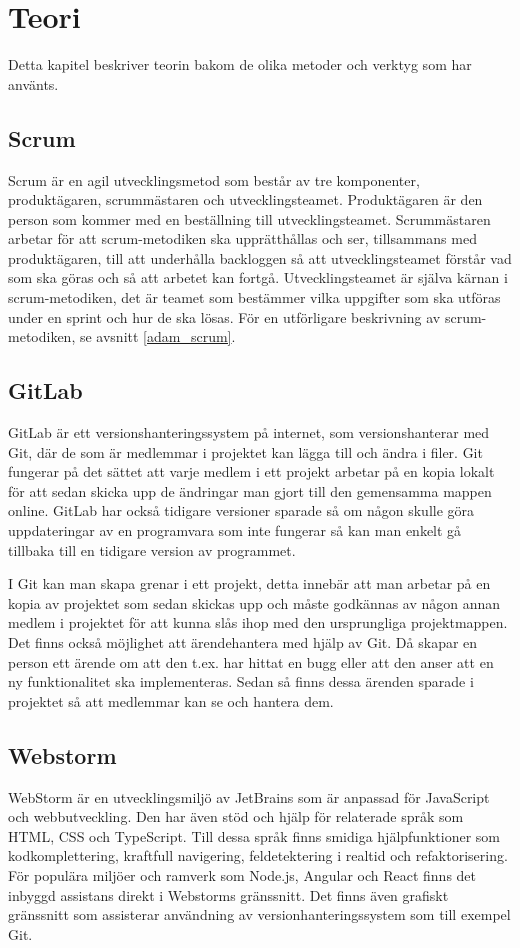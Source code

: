 \chapter{Teori}
Detta kapitel beskriver teorin bakom de olika metoder och verktyg som har använts.

\section{Scrum} \label{scrum}
Scrum är en agil utvecklingsmetod som består av tre komponenter, produktägaren, scrummästaren och utvecklingsteamet. 
Produktägaren är den person som kommer med en beställning till utvecklingsteamet. 
Scrummästaren arbetar för att scrum-metodiken ska upprätthållas och ser, tillsammans med produktägaren, till att underhålla backloggen så att utvecklingsteamet förstår vad som ska göras och så att arbetet kan fortgå. 
Utvecklingsteamet är själva kärnan i scrum-metodiken, det är teamet som bestämmer vilka uppgifter som ska utföras under en sprint och hur de ska lösas. 
För en utförligare beskrivning av scrum-metodiken, se avsnitt \ref{adam_scrum}.

\section{GitLab}
GitLab är ett versionshanteringssystem på internet, som versionshanterar med Git, där de som är medlemmar i projektet kan lägga till och ändra i filer. 
Git fungerar på det sättet att varje medlem i ett projekt arbetar på en kopia lokalt för att sedan skicka upp de ändringar man gjort till den gemensamma mappen online. 
GitLab har också tidigare versioner sparade så om någon skulle göra uppdateringar av en programvara som inte fungerar så kan man enkelt gå tillbaka till en tidigare version av programmet.

I Git kan man skapa grenar i ett projekt, detta innebär att man arbetar på en kopia av projektet som sedan skickas upp och måste godkännas av någon annan medlem i projektet för att kunna slås ihop med den ursprungliga projektmappen. 
Det finns också möjlighet att ärendehantera med hjälp av Git. 
Då skapar en person ett ärende om att den t.ex. har hittat en bugg eller att den anser att en ny funktionalitet ska implementeras. 
Sedan så finns dessa ärenden sparade i projektet så att medlemmar kan se och hantera dem. \cite{gitlab}

\section{Webstorm}
WebStorm är en utvecklingsmiljö av JetBrains som är anpassad för JavaScript och webbutveckling. Den har även stöd och hjälp för relaterade språk som HTML, CSS och TypeScript. Till dessa språk finns smidiga hjälpfunktioner som kodkomplettering, kraftfull navigering, feldetektering i realtid och refaktorisering. För populära miljöer och ramverk som Node.js, Angular och React finns det inbyggd assistans direkt i Webstorms gränssnitt. Det finns även grafiskt gränssnitt som assisterar användning av versionhanteringssystem som till exempel Git.\cite{webstorm}
